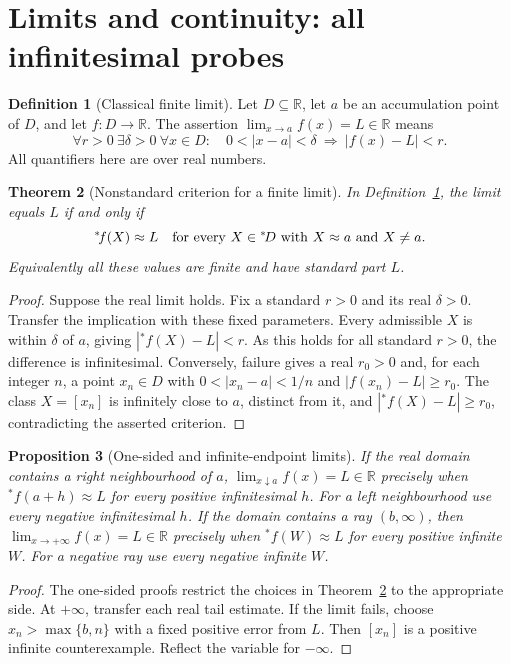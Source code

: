 \documentclass[11pt]{article}
\newtheorem{theorem}{Theorem}[section]
\newtheorem{proposition}[theorem]{Proposition}
\theoremstyle{definition}
\newtheorem{definition}[theorem]{Definition}
\theoremstyle{remark}
\newcommand{\RR}{\mathbb R}
\newcommand{\ext}[1]{{}^{*}\!#1}
\begin{document}
\section{Limits and continuity: all infinitesimal probes}
\begin{definition}[Classical finite limit]\label{def:limit}
Let \(D\subseteq\RR\), let \(a\) be an accumulation point of \(D\), and
let \(f:D\to\RR\). The assertion \(\lim_{x\to a}f(x)=L\in\RR\) means
\[
\forall r>0\ \exists\delta>0\ \forall x\in D:
\quad0<|x-a|<\delta\ \Longrightarrow\ |f(x)-L|<r.
\]
All quantifiers here are over real numbers.
\end{definition}
\begin{theorem}[Nonstandard criterion for a finite limit]\label{thm:limit}
In Definition~\ref{def:limit}, the limit equals \(L\) if and only if
\[
\ext f(X)\approx L\quad\hbox{for every }X\in\ext D
\hbox{ with }X\approx a\hbox{ and }X\ne a.
\]
Equivalently all these values are finite and have standard part \(L\).
\end{theorem}
\begin{proof}
Suppose the real limit holds. Fix a standard \(r>0\) and its real \(\delta>0\).
Transfer the implication with these fixed parameters. Every admissible \(X\)
is within \(\delta\) of \(a\), giving \(|\ext f(X)-L|<r\). As this holds for
all standard \(r>0\), the difference is infinitesimal.
Conversely, failure gives a real \(r_0>0\) and, for each integer \(n\), a point
\(x_n\in D\) with \(0<|x_n-a|<1/n\) and \(|f(x_n)-L|\ge r_0\).
The class \(X=[x_n]\) is infinitely close to \(a\), distinct from it, and
\(|\ext f(X)-L|\ge r_0\), contradicting the asserted criterion.
\end{proof}
\begin{proposition}[One-sided and infinite-endpoint limits]\label{prop:other-limits}
If the real domain contains a right neighbourhood of \(a\),
\(\lim_{x\downarrow a} f(x)=L\in\RR\) precisely when
\(\ext f(a+h)\approx L\) for every positive infinitesimal \(h\).
For a left neighbourhood use every negative infinitesimal \(h\).
If the domain contains a ray \((b,\infty)\), then
\(\lim_{x\to+\infty}f(x)=L\in\RR\) precisely when
\(\ext f(W)\approx L\) for every positive infinite \(W\).
For a negative ray use every negative infinite \(W\).
\end{proposition}
\begin{proof}
The one-sided proofs restrict the choices in Theorem~\ref{thm:limit} to the
appropriate side. At \(+\infty\), transfer each real tail estimate. If the
limit fails, choose \(x_n>\max\{b,n\}\) with a fixed positive error from \(L\).
Then \([x_n]\) is a positive infinite counterexample. Reflect the variable
for \(-\infty\).
\end{proof}
\end{document}
